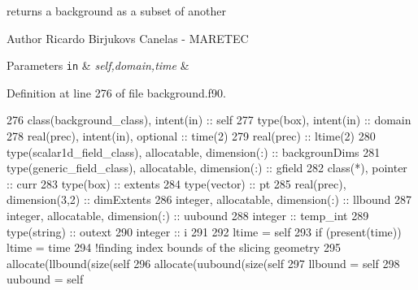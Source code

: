 returns a background as a subset of another 

\begin{DoxyAuthor}{Author}
Ricardo Birjukovs Canelas -\/ M\+A\+R\+E\+T\+EC 
\end{DoxyAuthor}

\begin{DoxyParams}[1]{Parameters}
\mbox{\tt in}  & {\em self,domain,time} & \\
\hline
\end{DoxyParams}


Definition at line 276 of file background.\+f90.


\begin{DoxyCode}
276     \textcolor{keywordtype}{class}(background\_class), \textcolor{keywordtype}{intent(in)} :: self
277     \textcolor{keywordtype}{type}(box), \textcolor{keywordtype}{intent(in)} :: domain
278     \textcolor{keywordtype}{real(prec)}, \textcolor{keywordtype}{intent(in)}, \textcolor{keywordtype}{optional} :: time(2)
279     \textcolor{keywordtype}{real(prec)} :: ltime(2)
280     \textcolor{keywordtype}{type}(scalar1d\_field\_class), \textcolor{keywordtype}{allocatable}, \textcolor{keywordtype}{dimension(:)} :: backgrounDims
281     \textcolor{keywordtype}{type}(generic\_field\_class), \textcolor{keywordtype}{allocatable}, \textcolor{keywordtype}{dimension(:)} :: gfield
282     \textcolor{keywordtype}{class}(*), \textcolor{keywordtype}{pointer} :: curr
283     \textcolor{keywordtype}{type}(box) :: extents
284     \textcolor{keywordtype}{type}(vector) :: pt
285     \textcolor{keywordtype}{real(prec)}, \textcolor{keywordtype}{dimension(3,2)} :: dimExtents
286     \textcolor{keywordtype}{integer}, \textcolor{keywordtype}{allocatable}, \textcolor{keywordtype}{dimension(:)} :: llbound
287     \textcolor{keywordtype}{integer}, \textcolor{keywordtype}{allocatable}, \textcolor{keywordtype}{dimension(:)} :: uubound
288     \textcolor{keywordtype}{integer} :: temp\_int
289     \textcolor{keywordtype}{type}(string) :: outext
290     \textcolor{keywordtype}{integer} :: i
291 
292     ltime = self%
293     \textcolor{keywordflow}{if} (\textcolor{keyword}{present}(time)) ltime = time
294     \textcolor{comment}{!finding index bounds of the slicing geometry}
295     \textcolor{keyword}{allocate}(llbound(\textcolor{keyword}{size}(self%
296     \textcolor{keyword}{allocate}(uubound(\textcolor{keyword}{size}(self%
297     llbound = self%
298     uubound = self%

\end{DoxyCode}
